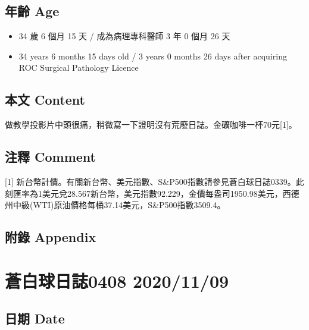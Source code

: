 \documentclass[
]{article}
\providecommand{\tightlist}{%
  \setlength{\itemsep}{0pt}\setlength{\parskip}{0pt}}
\begin{document}
\hypertarget{ux5e74ux9f61-age-63}{%
\subsection{年齡 Age}\label{ux5e74ux9f61-age-63}}

\begin{itemize}
\tightlist
\item
  34 歲 6 個月 15 天 / 成為病理專科醫師 3 年 0 個月 26 天
\item
  34 years 6 months 15 days old / 3 years 0 months 26 days after
  acquiring ROC Surgical Pathology Licence
\end{itemize}

\hypertarget{ux672cux6587-content-63}{%
\subsection{本文 Content}\label{ux672cux6587-content-63}}

做教學投影片中頭很痛，稍微寫一下證明沒有荒廢日誌。金礦咖啡一杯70元{[}1{]}。

\hypertarget{ux6ce8ux91cb-comment-63}{%
\subsection{注釋 Comment}\label{ux6ce8ux91cb-comment-63}}

{[}1{]}
新台幣計價。有關新台幣、美元指數、S\&P500指數請參見蒼白球日誌0339。此刻匯率為1美元兌28.567新台幣，美元指數92.229，金價每盎司1950.98美元，西德州中級(WTI)原油價格每桶37.14美元，S\&P500指數3509.4。

\hypertarget{ux9644ux9304-appendix-63}{%
\subsection{附錄 Appendix}\label{ux9644ux9304-appendix-63}}

\hypertarget{ux84bcux767dux7403ux65e5ux8a8c0408-20201109}{%
\section{蒼白球日誌0408
2020/11/09}\label{ux84bcux767dux7403ux65e5ux8a8c0408-20201109}}

\hypertarget{ux65e5ux671f-date-64}{%
\subsection{日期 Date}\label{ux65e5ux671f-date-64}}
\end{document}
